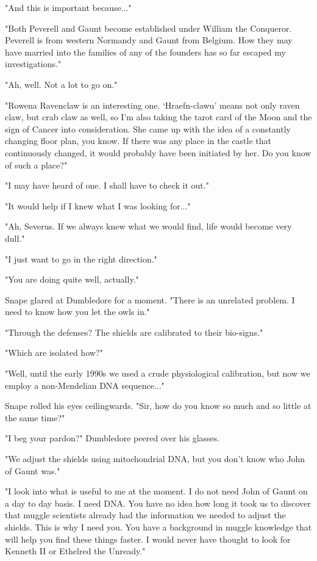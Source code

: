 \documentclass[a4paper,11pt]{article}
\begin{document}
"And this is important because..."

"Both Peverell and Gaunt become established under William the Conqueror. Peverell is from western Normandy and Gaunt from Belgium. How they may have married into the families of any of the founders has so far escaped my investigations."

"Ah, well. Not a lot to go on."

"Rowena Ravenclaw is an interesting one. `Hraefn-clawu' means not only raven claw, but crab claw as well, so I'm also taking the tarot card of the Moon and the sign of Cancer into consideration. She came up with the idea of a constantly changing floor plan, you know. If there was any place in the castle that continuously changed, it would probably have been initiated by her. Do you know of such a place?"

"I may have heard of one. I shall have to check it out."

"It would help if I knew what I was looking for..."

"Ah, Severus. If we always knew what we would find, life would become very dull."

"I just want to go in the right direction."

"You are doing quite well, actually."

Snape glared at Dumbledore for a moment. "There is an unrelated problem. I need to know how you let the owls in."

"Through the defenses? The shields are calibrated to their bio-signs."

"Which are isolated how?"

"Well, until the early 1990s we used a crude physiological calibration, but now we employ a non-Mendelian DNA sequence..."

Snape rolled his eyes ceilingwards. "Sir, how do you know so much and so little at the same time?"

"I beg your pardon?" Dumbledore peered over his glasses.

"We adjust the shields using mitochondrial DNA, but you don't know who John of Gaunt was."

"I look into what is useful to me at the moment. I do not need John of Gaunt on a day to day basis. I need DNA. You have no idea how long it took us to discover that muggle scientists already had the information we needed to adjust the shields. This is why I need you. You have a background in muggle knowledge that will help you find these things faster. I would never have thought to look for Kenneth II or Ethelred the Unready."
\end{document}
